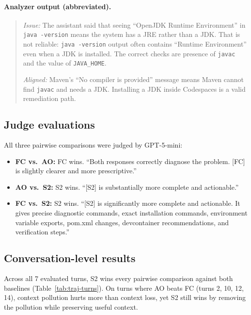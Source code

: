 \documentclass{article}
\begin{document}
\paragraph{Analyzer output (abbreviated).}
\begin{quote}
\emph{Issue:} The assistant said that seeing ``OpenJDK Runtime Environment'' in \texttt{java -version} means the system has a JRE rather than a JDK. That is not reliable: \texttt{java -version} output often contains ``Runtime Environment'' even when a JDK is installed. The correct checks are presence of \texttt{javac} and the value of \texttt{JAVA\_HOME}.

\emph{Aligned:} Maven's ``No compiler is provided'' message means Maven cannot find \texttt{javac} and needs a JDK. Installing a JDK inside Codespaces is a valid remediation path.
\end{quote}

\subsection{Judge evaluations}

All three pairwise comparisons were judged by GPT-5-mini:

\begin{itemize}
    \item \textbf{FC vs.\ AO:} FC wins. ``Both responses correctly diagnose the problem. [FC] is slightly clearer and more prescriptive.''
    \item \textbf{AO vs.\ S2:} S2 wins. ``[S2] is substantially more complete and actionable.''
    \item \textbf{FC vs.\ S2:} S2 wins. ``[S2] is significantly more complete and actionable. It gives precise diagnostic commands, exact installation commands, environment variable exports, pom.xml changes, devcontainer recommendations, and verification steps.''
\end{itemize}

\subsection{Conversation-level results}

Across all 7 evaluated turns, S2 wins every pairwise comparison against both baselines (Table~\ref{tab:traj-turns}). On turns where AO beats FC (turns 2, 10, 12, 14), context pollution hurts more than context loss, yet S2 still wins by removing the pollution while preserving useful context.
\end{document}
